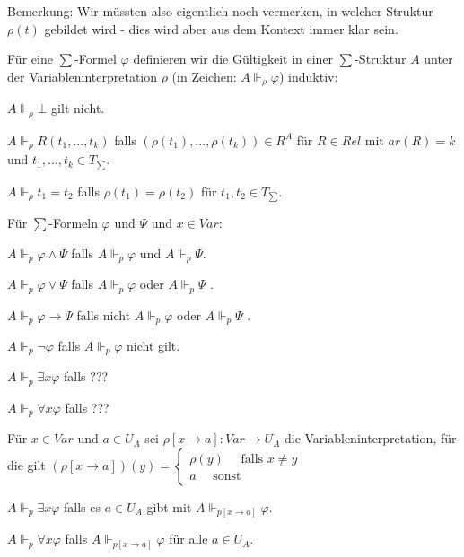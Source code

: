 \documentclass[a4paper]{article}
\begin{document}
\begin{multicols}{3}
  Bemerkung: Wir müssten also eigentlich noch vermerken, in welcher Struktur $\rho(t)$ gebildet wird - dies wird aber aus dem Kontext immer klar sein.

  Für eine $\sum$-Formel $\varphi$ definieren wir die Gültigkeit in einer $\sum$-Struktur $A$ unter der Variableninterpretation $\rho$ (in Zeichen: $A\Vdash_\rho\varphi$) induktiv:
  \begin{itemize*}
    \item $A\Vdash_\rho\bot$ gilt nicht.
    \item $A\Vdash_\rho R(t_1,...,t_k)$ falls $(\rho(t_1),...,\rho(t_k))\in R^A$ für $R\in Rel$ mit $ar(R)=k$ und $t_1,...,t_k\in T_{\sum}$.
    \item $A\Vdash_\rho t_1 =t_2$ falls $\rho(t_1) =\rho(t_2)$ für $t_1,t_2\in T_{\sum}$.
  \end{itemize*}

  Für $\sum$-Formeln $\varphi$ und $\Psi$ und $x\in Var$:
  \begin{itemize*}
    \item $A\Vdash_p \varphi\wedge\Psi$ falls $A\Vdash_p\varphi$ und $A\Vdash_p \Psi$.
    \item $A\Vdash_p \varphi\vee\Psi$ falls $A\Vdash_p\varphi$ oder $A\Vdash_p\Psi$ .
    \item $A\Vdash_p \varphi\rightarrow\Psi$ falls nicht $A\Vdash_p\varphi$ oder $A\Vdash_p\Psi$ .
    \item $A\Vdash_p \lnot\varphi$ falls $A\Vdash_p \varphi$ nicht gilt.
    \item $A\Vdash_p \exists x\varphi$ falls ???
    \item $A\Vdash_p \forall x\varphi$ falls ???
  \end{itemize*}

  Für $x\in Var$ und $a\in U_A$ sei $\rho[x\rightarrow a]:Var\rightarrow U_A$ die Variableninterpretation, für die gilt $(\rho[x\rightarrow a])(y) = \begin{cases} \rho(y) \quad\text{ falls } x\not=y \\ a \quad\text{ sonst } \end{cases}$
  \begin{itemize*}
    \item $A\Vdash_p \exists x\varphi$ falls es $a\in U_A$ gibt mit $A\Vdash_{p[x\rightarrow a]}\varphi$.
    \item $A\Vdash_p \forall x\varphi$ falls $A\Vdash_{p[x\rightarrow a]}\varphi$ für alle $a\in U_A$.
  \end{itemize*}


\end{multicols}
\end{document}
